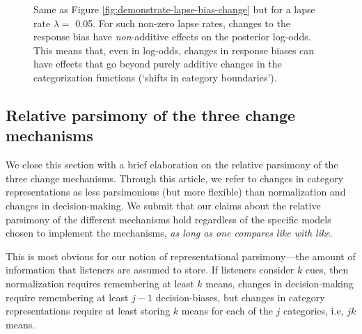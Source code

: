 \documentclass[
  11pt,
  man,floatsintext]{apa6}
\begin{document}
\begin{figure}

{\centering {}

}

\caption[Same as Figure \ref{fig:demonstrate-lapse-bias-change} but for a lapse rate \(\lambda=\) 0.05. For such non-zero lapse rates, changes to the response bias have \emph{non}-additive effects on the posterior log-odds. This means that, even in log-odds, changes in response biases can have effects that go beyond purely additive changes in the categorization functions (`shifts in category boundaries').]{Same as Figure \ref{fig:demonstrate-lapse-bias-change} but for a lapse rate \(\lambda=\) 0.05. For such non-zero lapse rates, changes to the response bias have \emph{non}-additive effects on the posterior log-odds. This means that, even in log-odds, changes in response biases can have effects that go beyond purely additive changes in the categorization functions (`shifts in category boundaries').}\label{fig:demonstrate-lapse-bias-change-nonzero-lapse}
\end{figure}

\hypertarget{sec:parsimony}{%
\subsection{Relative parsimony of the three change mechanisms}\label{sec:parsimony}}

We close this section with a brief elaboration on the relative parsimony of the three change mechanisms. Through this article, we refer to changes in category representations as less parsimonious (but more flexible) than normalization and changes in decision-making. We submit that our claims about the relative parsimony of the different mechanisms hold regardless of the specific models chosen to implement the mechanisms, \emph{as long as one compares like with like}.

This is most obvious for our notion of representational parsimony---the amount of information that listeners are assumed to store. If listeners consider \(k\) cues, then normalization requires remembering at least \(k\) means, changes in decision-making require remembering at least \(j-1\) decision-biases, but changes in category representations require at least storing \(k\) means for each of the \(j\) categories, i.e, \(jk\) means.
\end{document}
